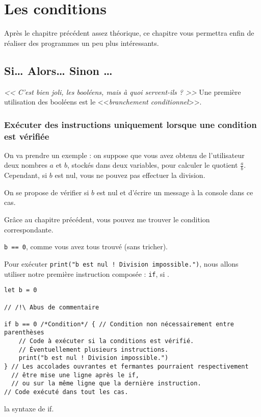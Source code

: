 \chapter{Les conditions}
Après le chapitre précédent assez théorique, ce chapitre vous permettra enfin de réaliser des programmes un peu plus intéressants.
\section{Si… Alors… Sinon …}
\emph{<< C'est bien joli, les booléens, mais à quoi servent-ils ? >>}
Une première utilisation des booléens est le <<\emph{branchement conditionnel}>>.
\subsection{Exécuter des instructions uniquement lorsque une condition est vérifiée}
On va prendre un exemple : on suppose que vous avez obtenu de l'utilisateur deux nombres $a$ et $b$, stockés dans deux variables, pour calculer le quotient $\frac{a}{b}$.
Cependant, si $b$ est nul, vous ne pouvez pas effectuer la division. %

On se propose de vérifier si $b$ est nul et d'écrire un message à la console dans ce cas.

Grâce au chapitre précédent, vous pouvez me trouver le condition correspondante.

\pagebreak %
\texttt{b == 0}, comme vous avez tous trouvé (sans tricher).

Pour exécuter \texttt{print("b est nul ! Division impossible.")}, nous allons utiliser notre première instruction composée : \texttt{if}, \og si \fg{}.

\begin{listing}[h]
\begin{verbatim}
let b = 0

// /!\ Abus de commentaire

if b == 0 /*Condition*/ { // Condition non nécessairement entre parenthèses
    // Code à exécuter si la conditions est vérifié.
    // Éventuellement plusieurs instructions.
    print("b est nul ! Division impossible.")
} // Les accolades ouvrantes et fermantes pourraient respectivement
  // être mise une ligne après le if,
  // ou sur la même ligne que la dernière instruction.
// Code exécuté dans tout les cas.
\end{verbatim}
\caption{la syntaxe de if.}
\end{listing}
